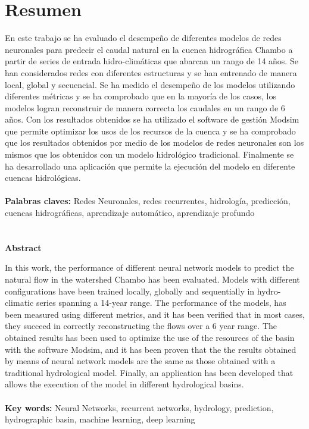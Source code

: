 \setcounter{page}{1}
\chapter*{Resumen}

En este trabajo se ha evaluado el desempeño de diferentes modelos de redes neuronales
para predecir el caudal natural en la cuenca hidrográfica Chambo  a partir de series de
entrada hidro-climáticas que abarcan un rango de 14 años. Se han considerados redes con
diferentes estructuras y se han entrenado de manera local, global y secuencial. Se ha medido el
desempeño de los modelos utilizando diferentes métricas y se ha comprobado que en la
mayoría de los casos, los modelos logran reconstruir de manera correcta los caudales en un
rango de 6 años. Con los resultados obtenidos se ha utilizado el software de gestión Modsim
que permite optimizar los usos de los recursos de la cuenca y se ha comprobado que los
resultados obtenidos por medio de los modelos de redes neuronales son los mismos que los obtenidos con un
modelo hidrológico tradicional. Finalmente se ha desarrollado una aplicación que permite la ejecución del modelo
en diferente cuencas hidrológicas.\\
\\
\textbf{Palabras claves:} Redes Neuronales, redes recurrentes, hidrología, predicción, cuencas hidrográficas, aprendizaje automático, aprendizaje profundo\\
\\
\\
\large{\textbf{Abstract}}
\vspace{5mm}

In this work, the performance of different neural network models
to predict the natural flow in the  watershed Chambo  has been evaluated. 
Models with different configurations  have been trained locally, globally and sequentially  in 
hydro-climatic series spanning a 14-year range.
The performance of the models, has been measured
using different metrics, and it has been verified that in most cases, they succeed in correctly reconstructing the flows over a
6 year range. The obtained results  has been used to optimize the use of the resources of the basin with the software Modsim, 
and it has been proven that the the results obtained by means of neural network models are the same as those obtained with a
traditional hydrological model. Finally, an application has been developed that allows the execution of the model
in different hydrological basins.\\
\\
\textbf{Key words:} Neural Networks, recurrent networks, hydrology, prediction, hydrographic basin, machine learning, deep learning